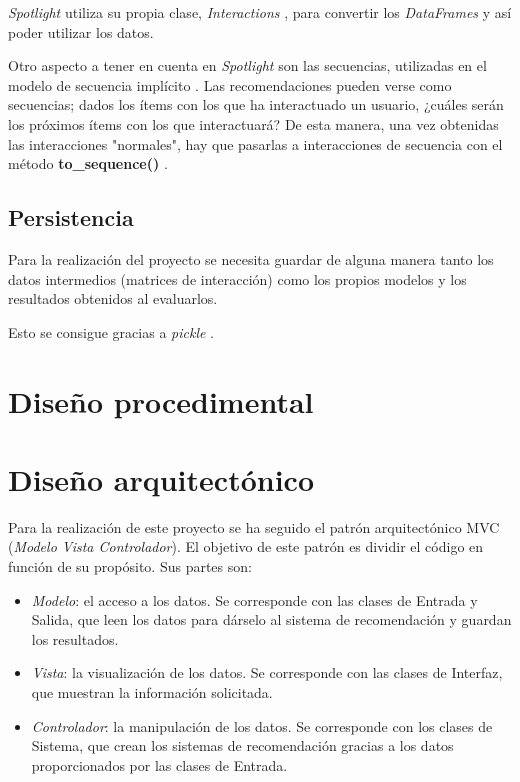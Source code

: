 \textit{Spotlight} utiliza su propia clase, \textit{Interactions} \cite{interactions-spotlight}, para convertir los \textit{DataFrames} y así poder utilizar los datos.

Otro aspecto a tener en cuenta en \textit{Spotlight} son las secuencias, utilizadas en el modelo de secuencia implícito \cite{modelo-secuencia}. Las recomendaciones pueden verse como secuencias; dados los ítems con los que ha interactuado un usuario, ¿cuáles serán los próximos ítems con los que interactuará? De esta manera, una vez obtenidas las interacciones "normales", hay que pasarlas a interacciones de secuencia con el método \textbf{to\_sequence()} \cite{to_sequence}.

\subsection{Persistencia}\label{persistencia}
Para la realización del proyecto se necesita guardar de alguna manera tanto los datos intermedios (matrices de interacción) como los propios modelos y los resultados obtenidos al evaluarlos.

Esto se consigue gracias a \textit{pickle} \cite{pickle}.

\section{Diseño procedimental}

\section{Diseño arquitectónico}
Para la realización de este proyecto se ha seguido el patrón arquitectónico MVC (\textit{Modelo Vista Controlador}). El objetivo de este patrón es dividir el código en función de su propósito. Sus partes son:
\begin{itemize}
\tightlist
\item \textit{Modelo}: el acceso a los datos. Se corresponde con las clases de Entrada y Salida, que leen los datos para dárselo al sistema de recomendación y guardan los resultados.
\item \textit{Vista}: la visualización de los datos. Se corresponde con las clases de Interfaz, que muestran la información solicitada.
\item \textit{Controlador}: la manipulación de los datos. Se corresponde con los clases de Sistema, que crean los sistemas de recomendación gracias a los datos proporcionados por las clases de Entrada.
\end{itemize}

